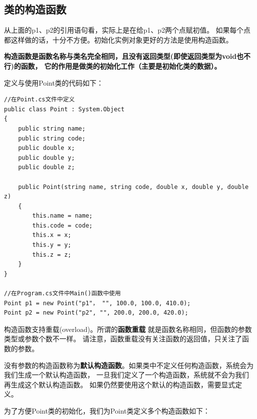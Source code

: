 \subsection{类的构造函数}

从上面的p1、p2的引用语句看，实际上是在给p1、p2两个点赋初值。
如果每个点都这样做的话，十分不方便。初始化实例对象更好的方法是使用构造函数。

\textbf{构造函数是函数名称与类名完全相同，且没有返回类型(即使返回类型为void也不行)的函数，
它的作用是做类的初始化工作（主要是初始化类的数据）。}

定义与使用Point类的代码如下：
\begin{lstlisting}
//在Point.cs文件中定义
public class Point : System.Object
{
    public string name;
    public string code;
    public double x;
    public double y;
    public double z;

    public Point(string name, string code, double x, double y, double z)
    {
        this.name = name;
        this.code = code;
        this.x = x;
        this.y = y;
        this.z = z;
    }
}

//在Program.cs文件中Main()函数中使用
Point p1 = new Point("p1"， "", 100.0, 100.0, 410.0);
Point p2 = new Point("p2", "", 200.0, 200.0, 420.0);
\end{lstlisting}

构造函数支持重载(overload)。所谓的\textbf{函数重载} 就是函数名称相同，但函数的参数类型或参数个数不一样。
请注意，函数重载没有关注函数的返回值，只关注了函数的参数。

没有参数的构造函数称为\textbf{默认构造函数}。如果类中不定义任何构造函数，系统会为我们生成一个默认构造函数，
一旦我们定义了一个构造函数，系统就不会为我们再生成这个默认构造函数。
如果仍然要使用这个默认的构造函数，需要显式定义。

为了方便Point类的初始化，我们为Point类定义多个构造函数如下：

